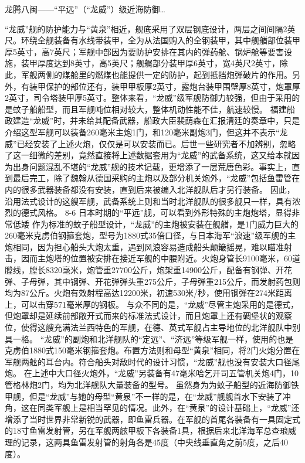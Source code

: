 \documentclass[12pt,UTF8]{ctexbook}
\begin{document}
龙腾八闽——“平远”（“龙威”）级近海防御…

“龙威”舰的防护能力与“黄泉”相近，舰底采用了双层钢底设计，两层之间间隔2英尺。环绕全舰装备有水线带装甲，全为从法国购入的全钢装甲，其中舰艏部位装甲厚5英寸，高7英尺；军舰中部因为要防护安排在其内的弹药舱、锅炉舱等要害设施，装甲厚度达到8英寸，高5英尺；舰艉部分装甲厚6英寸，宽4英尺2英寸，除此，军舰两侧的煤舱里的燃煤也能提供一定的防护，起到抵挡炮弹破片的作用。另外，有装甲保护的部位还有，装甲甲板厚2英寸，露炮台装甲围壁厚8英寸，炮罩厚2英寸，司令塔装甲厚5英寸。整体来看，“龙威”级军舰防御力较强，但由于采用的是蚊子船船型，而且军舰吨位相对较大，整体机动性能不佳，航速较慢。
福建船政建造“龙威”时，并未给其配备武器，船政大臣裴荫森在汇报清廷的奏章中，只是介绍这型军舰可以装备260毫米主炮1门，和120毫米副炮3门，但这并不表示“龙威”已经安装了上述火炮，仅仅是可以安装而已。后世一些研究者不加辨别，忽略了这一细微的差别，竟然直接将上述数据套用为“龙威”的武备系统，这又给本就因为出身问题混乱不堪的“龙威”舰的技术记载，更增添了一层荒唐色彩。事实上，直到最后完工，除了魏翰从德国采购的主炮以及部分机关炮外，“龙威”包括鱼雷管在内的很多武器装备都没有安装，直到后来被编入北洋舰队后才另行装备。 因此，沿用法式设计的这艘军舰，武备系统上则和当时北洋舰队的很多舰只一样，具有浓烈的德式风格。
8-6
日本时期的“平远”舰，可以看到外形特殊的主炮炮塔，显得非常低矮
作为标准的蚊子船型设计，“龙威”的主炮被安装在舰艏，是1门威力巨大的260毫米克虏伯钢箍套炮，型号为1880式35倍口径，与日本海军“浪速”级军舰的主炮相同，因为担心船头大炮太重，遇到风浪容易造成船头颠簸摇晃，难以瞄准射击，因而主炮塔的位置被安排在接近军舰的中腰附近。火炮身管长9100毫米，60道膛线，膛长8320毫米，炮管重27700公斤，炮架重14900公斤，配备有钢弹、开花弹、子母弹，其中钢弹、开花弹弹头重275公斤，子母弹重215公斤，而发射药包则均为87公斤。火炮有效射程高达12200米，初速530米/秒，使用钢弹在274米距离上，可以击穿571毫米厚的钢板。 与众不同的是，“龙威”尽管主炮采用的是德式，但炮罩却是延续前部敞开式而来的标准法式设计，而且炮罩上还有碉堡状的观察位，使得这艘充满法兰西特色的军舰，在德、英式军舰占主导地位的北洋舰队中别具一格。
“龙威”的副炮和北洋舰队的“定远”、“济远”等级军舰一样，使用的也是克虏伯1880式150毫米钢箍套炮。布置方法则和母型“黄泉”相同，将2门火炮分置在军舰两舷的耳台内。符合船头对敌时代的设计习惯，“龙威”舰也没有安装大口径尾炮。
在上述中大口径火炮外，“龙威”另装备有47毫米哈乞开司五管机关炮4门，10管格林炮2门，均为北洋舰队大量装备的型号。
虽然身为为蚊子船型的近海防御铁甲舰，但是“龙威”与她的母型“黄泉”不一样的是，在“龙威”舰舰首水下安装了冲角，这在同类军舰上是相当罕见的情况。此外，在“黄泉”的设计基础上，“龙威”还增添了当时世界非常新锐的武器，即鱼雷兵器。在军舰的首尾各装备有一具固定式的18寸鱼雷发射管，另在军舰两舷甲板下各装备1具，根据后来北洋海军总查琅威理的记录，这两具鱼雷发射管的射角各是45度（中央线垂直角之前5度，之后40度）。
\end{document}

